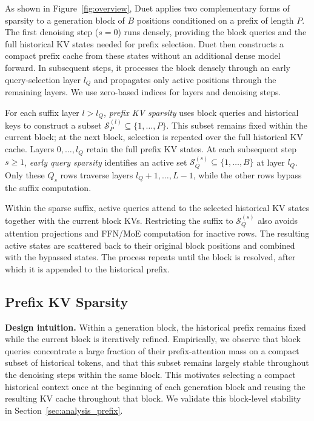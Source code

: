 As shown in Figure~\ref{fig:overview}, Duet applies two complementary forms of sparsity to a generation block of $B$ positions conditioned on a prefix of length $P$. The first denoising step ($s=0$) runs densely, providing the block queries and the full historical KV states needed for prefix selection. Duet then constructs a compact prefix cache from these states without an additional dense model forward. In subsequent steps, it processes the block densely through an early query-selection layer $l_Q$ and propagates only active positions through the remaining layers. We use zero-based indices for layers and denoising steps.

For each suffix layer $l>l_Q$, \emph{prefix KV sparsity} uses block queries and historical keys to construct a subset $\mathcal{S}_{P}^{(l)}\subseteq\{1,\ldots,P\}$. This subset remains fixed within the current block; at the next block, selection is repeated over the full historical KV cache. Layers $0,\ldots,l_Q$ retain the full prefix KV states. At each subsequent step $s\geq1$, \emph{early query sparsity} identifies an active set $\mathcal{S}_{Q}^{(s)}\subseteq\{1,\ldots,B\}$ at layer $l_Q$. Only these $Q_s$ rows traverse layers $l_Q+1,\ldots,L-1$, while the other rows bypass the suffix computation.

Within the sparse suffix, active queries attend to the selected historical KV states together with the current block KVs. Restricting the suffix to $\mathcal{S}_{Q}^{(s)}$ also avoids attention projections and FFN/MoE computation for inactive rows. The resulting active states are scattered back to their original block positions and combined with the bypassed states. The process repeats until the block is resolved, after which it is appended to the historical prefix.


\subsection{Prefix KV Sparsity}
\label{sec:method_prefix}

\textbf{Design intuition.}
Within a generation block, the historical prefix remains fixed while the current block is iteratively refined. Empirically, we observe that block queries concentrate a large fraction of their prefix-attention mass on a compact subset of historical tokens, and that this subset remains largely stable throughout the denoising steps within the same block. This motivates selecting a compact historical context once at the beginning of each generation block and reusing the resulting KV cache throughout that block. We validate this block-level stability in Section~\ref{sec:analysis_prefix}.


